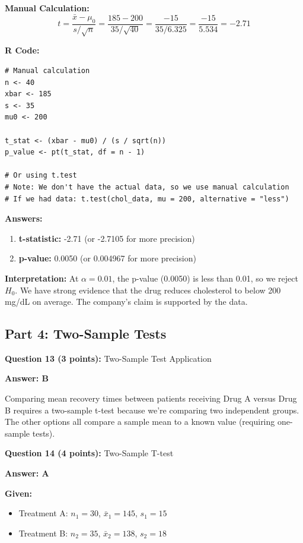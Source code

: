 \documentclass[11pt]{article}
\begin{document}
\textbf{Manual Calculation:}
$$t = \frac{\bar{x} - \mu_0}{s/\sqrt{n}} = \frac{185 - 200}{35/\sqrt{40}} = \frac{-15}{35/6.325} = \frac{-15}{5.534} = -2.71$$

\textbf{R Code:}
\begin{verbatim}
# Manual calculation
n <- 40
xbar <- 185
s <- 35
mu0 <- 200

t_stat <- (xbar - mu0) / (s / sqrt(n))
p_value <- pt(t_stat, df = n - 1)

# Or using t.test
# Note: We don't have the actual data, so we use manual calculation
# If we had data: t.test(chol_data, mu = 200, alternative = "less")
\end{verbatim}

\textcolor{correctgreen}{\textbf{Answers:}}
\begin{enumerate}[label=\alph*)]
\item \textbf{t-statistic:} \textcolor{correctgreen}{-2.71} (or -2.7105 for more precision)
\item \textbf{p-value:} \textcolor{correctgreen}{0.0050} (or 0.004967 for more precision)
\end{enumerate}

\textbf{Interpretation:} At $\alpha = 0.01$, the p-value (0.0050) is less than 0.01, so we reject $H_0$. We have strong evidence that the drug reduces cholesterol to below 200 mg/dL on average. The company's claim is supported by the data.

\newpage

\subsection*{Part 4: Two-Sample Tests}

\textbf{Question 13 (3 points):} Two-Sample Test Application

\textcolor{correctgreen}{\textbf{Answer: B}}

Comparing mean recovery times between patients receiving Drug A versus Drug B requires a two-sample t-test because we're comparing two independent groups. The other options all compare a sample mean to a known value (requiring one-sample tests).

\vspace{0.5cm}

\textbf{Question 14 (4 points):} Two-Sample T-test

\textcolor{correctgreen}{\textbf{Answer: A}}

\textbf{Given:}
\begin{itemize}
\item Treatment A: $n_1 = 30$, $\bar{x}_1 = 145$, $s_1 = 15$
\item Treatment B: $n_2 = 35$, $\bar{x}_2 = 138$, $s_2 = 18$
\end{itemize}
\end{document}

